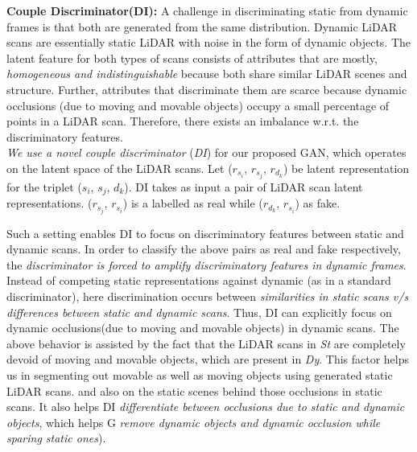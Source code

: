 \documentclass[10pt,twocolumn,letterpaper]{article}
\begin{document}
\textbf{Couple Discriminator(DI):} A  challenge in discriminating static from dynamic frames is that both are generated from the same distribution. Dynamic LiDAR scans are essentially static LiDAR with noise in the form of dynamic objects. The latent feature for both types of scans consists of attributes that are mostly, \textit{homogeneous and indistinguishable} because both share similar LiDAR scenes and structure. Further, attributes that discriminate them are scarce because dynamic occlusions (due to moving and movable objects) occupy a small percentage of points in a LiDAR scan. Therefore, there exists an imbalance w.r.t. the discriminatory features. \\
\textit{We use a novel couple discriminator} (\textit{DI}) for our proposed GAN, which operates on the latent space of the LiDAR scans. Let ($r_{s_i}$, $r_{s_j}$, $r_{d_k}$) be latent representation for the triplet (${s_i}$, ${s_j}$, ${d_k}$).
DI takes as input a pair of LiDAR scan latent representations. ($r_{s_j}$, $r_{s_i}$) is a labelled as real while ($r_{d_k}$, $r_{s_i}$) as fake. 

Such a setting enables DI to focus on discriminatory features between static and dynamic scans. In order to classify the above pairs as real and fake respectively, the \textit{discriminator is forced to amplify discriminatory features in dynamic frames}. Instead of competing static representations against dynamic (as in a standard discriminator), here discrimination occurs between \textit{similarities in static scans v/s differences between static and dynamic scans}. Thus, DI can explicitly focus on  dynamic occlusions(due to moving and movable objects) in dynamic scans. The above behavior is assisted by the fact that the LiDAR scans in \textit{St} are completely devoid of moving and movable objects, which are present in \textit{Dy}.
 This factor helps us in segmenting out movable as well as moving objects using generated static LiDAR scans. 
and also on the static scenes behind those occlusions in static scans.  It also helps DI \textit{differentiate between occlusions due to static and dynamic objects}, which helps G \textit{remove dynamic objects and dynamic occlusion while sparing static ones}). 
\end{document}
